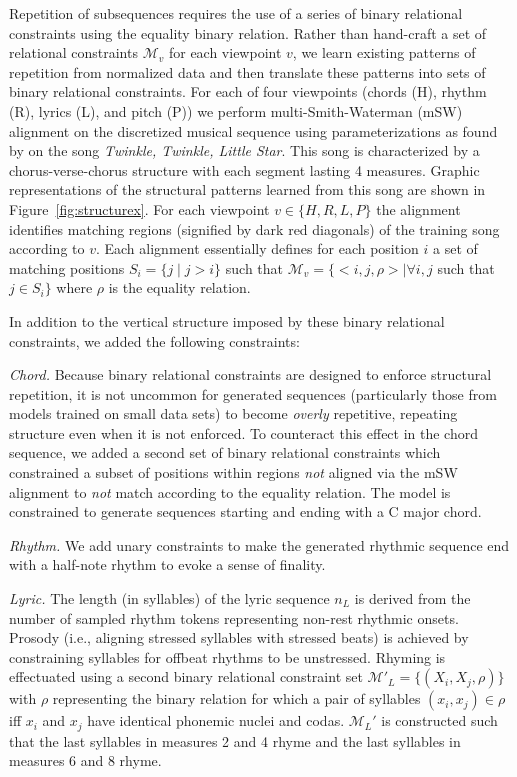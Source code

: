 \documentclass[phd,electronic,oneside,twosidetoc,letterpaper,chaptercenter,parttop,lof,lot]{byumsphd}
\begin{document}
Repetition of subsequences requires the use of a series of binary relational constraints using the equality binary relation. Rather than hand-craft a set of relational constraints $\mathcal{M}_{v}$ for each viewpoint $v$, we learn existing patterns of repetition from normalized data and then translate these patterns into sets of binary relational constraints. For each of four viewpoints (chords (H), rhythm (R), lyrics (L), and pitch (P)) we perform multi-Smith-Waterman (mSW) alignment on the discretized musical sequence using parameterizations as found by \citeauthor{bodily2018abstract} \cite{bodily2018abstract} on the song \textit{Twinkle, Twinkle, Little Star}. This song is characterized by a chorus-verse-chorus structure with each segment lasting 4 measures. Graphic representations of the structural patterns learned from this song are shown in Figure~\ref{fig:structurex}. For each viewpoint $v\in\{H,R,L,P\}$ the alignment identifies matching regions (signified by dark red diagonals) of the training song according to $v$. Each alignment essentially defines for each position $i$ a set of matching positions $S_i=\{j\mid j>i\}$ such that $\mathcal{M}_v =\{<i,j,\rho>\mid \forall i,j$ such that $j\in S_i\}$ where $\rho$ is the equality relation.

In addition to the vertical structure imposed by these binary relational constraints, we added the following constraints:

\emph{Chord.} Because binary relational constraints are designed to enforce structural repetition, it is not uncommon for generated sequences (particularly those from models trained on small data sets) to become \emph{overly} repetitive, repeating structure even when it is not enforced. To counteract this effect in the chord sequence, we added a second set of binary relational constraints which constrained a subset of positions within regions \emph{not} aligned via the mSW alignment to \emph{not} match according to the equality relation. The model is constrained to generate sequences starting and ending with a C major chord. 

\emph{Rhythm.} We add unary constraints to make the generated rhythmic sequence end with a half-note rhythm to evoke a sense of finality. 

\emph{Lyric.} The length (in syllables) of the lyric sequence $n_L$ is derived from the number of sampled rhythm tokens representing non-rest rhythmic onsets. Prosody (i.e., aligning stressed syllables with stressed beats) is achieved by constraining syllables for offbeat rhythms to be unstressed. Rhyming is effectuated using a second binary relational constraint set $\mathcal{M}'_L=\{(X_i,X_j,\rho)\}$ with $\rho$ representing the binary relation for which a pair of syllables $(x_i,x_j)\in \rho$ iff $x_i$ and $x_j$ have identical phonemic nuclei and codas. $\mathcal{M}_L'$ is constructed such that the last syllables in measures 2 and 4 rhyme and the last syllables in measures 6 and 8 rhyme. 
\end{document}
